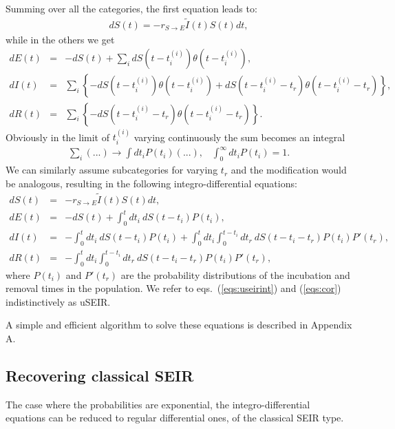 \documentclass[a4paper,oneside,11pt]{article}
\begin{document}
Summing over all the categories, the first equation leads to:
\begin{eqnarray}
d S(t) = - r_{S\rightarrow E} \tilde{I}(t) S(t) dt,
\end{eqnarray}
while in the others we get
\begin{eqnarray}
d E(t) &=& -d S(t) + \sum_i d S(t-t^{(i)}_i) \theta(t-t^{(i)}_i) ,\nonumber\\
d I(t) &=& \sum_i  \left\{-d S(t-t^{(i)}_i) \theta(t-t^{(i)}_i)+ d S(t-t^{(i)}_i-t_r) \theta(t-t^{(i)}_i-t_r)\right\},\nonumber\\
d R(t) &=& \sum_i \left\{- d S(t - t^{(i)}_i - t_r) \theta(t-t^{(i)}_i-t_r)\right\}.
\label{eqs:corint}
\end{eqnarray}
Obviously in the limit of $t_i^{(i)}$ varying continuously the sum becomes an integral
\begin{eqnarray}
\sum_i  (...) \rightarrow \int dt_i P(t_i) (...), \;\;\; \int_0^\infty dt_i P(t_i) = 1.
\end{eqnarray}
We can similarly assume subcategories for varying $t_r$ and the modification would be analogous, resulting in the following integro-differential equations:
\begin{eqnarray}
d S(t) &=& - r_{S\rightarrow E} \tilde{I}(t) S(t) dt,\nonumber\\
d E(t) &=& -d S(t) + \int_0^{t} dt_i ~d S(t-t_i) P(t_i) ,\nonumber\\
d I(t) &=& -\int_0^{t} dt_i  ~d S(t-t_i) P(t_i) + \int_0^{t} d t_i \int_0^{t-t_i} dt_r~ dS(t-t_i-t_r) P(t_i) P'(t_r),\nonumber\\
d R(t) &=& -\int_0^{t} d t_i \int_0^{t-t_i} dt_r~ dS(t-t_i-t_r) P(t_i) P'(t_r),
\label{eqs:useirint}
\end{eqnarray}
where $P(t_i)$ and $P'(t_r)$ are the probability distributions of the incubation and removal times in the population. We refer to eqs.~(\ref{eqs:useirint}) and (\ref{eqs:cor}) indistinctively as uSEIR.

A simple and efficient algorithm to solve these equations is described in Appendix A.




\subsection{Recovering classical SEIR}

The case where the probabilities are exponential, the integro-differential equations can be reduced to regular differential ones, of the classical SEIR type.
\end{document}
